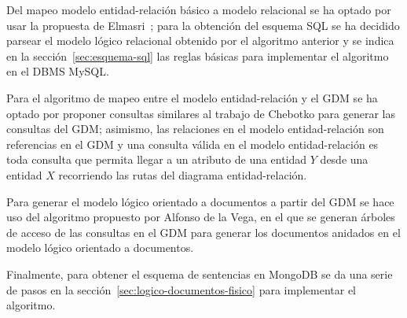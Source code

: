 Del mapeo modelo entidad-relación básico a modelo relacional se ha optado por usar la propuesta de Elmasri~\cite{ramez_elmasri_fundamentos_nodate}; para la obtención del esquema SQL se ha decidido parsear el modelo lógico relacional obtenido por el algoritmo anterior y se indica en la sección~\ref{sec:esquema-sql} las reglas básicas para implementar el algoritmo en el DBMS MySQL.


Para el algoritmo de mapeo entre el modelo entidad-relación y el GDM se ha optado por proponer consultas similares al trabajo de Chebotko\cite{chebotko_big_2015} para generar las consultas del GDM; asimismo, las relaciones en el modelo entidad-relación son referencias en el GDM y una consulta válida en el modelo entidad-relación es toda consulta que permita llegar a un atributo de una entidad $Y$ desde una entidad $X$ recorriendo las rutas del diagrama entidad-relación.


Para generar el modelo lógico orientado a documentos a partir del GDM se hace uso del algoritmo propuesto por Alfonso de la Vega, en el que se generan árboles de acceso de las consultas en el GDM para generar los documentos anidados en el modelo lógico orientado a documentos.


Finalmente, para obtener el esquema de sentencias en MongoDB se da una serie de pasos en la sección~\ref{sec:logico-documentos-fisico} para implementar el algoritmo.